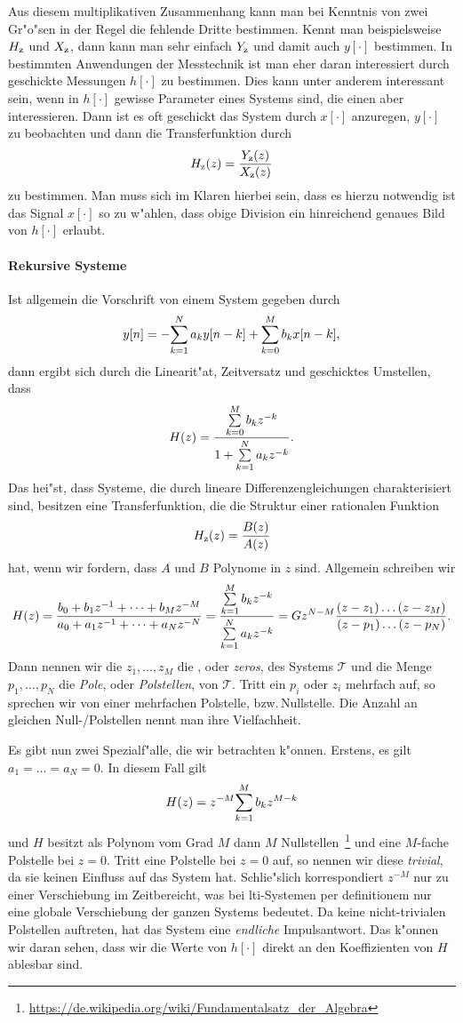 Aus diesem multiplikativen Zusammenhang kann man bei Kenntnis von zwei Gr"o"sen in der Regel die fehlende Dritte bestimmen.
Kennt man beispielsweise $H_{\rm z}$ und $X_{\rm z}$, dann kann man sehr einfach $Y_{\rm z}$ und damit auch $y[\cdot]$ bestimmen.
In bestimmten Anwendungen der Messtechnik ist man eher daran interessiert durch geschickte Messungen $h[\cdot]$ zu bestimmen.
Dies kann unter anderem interessant sein, wenn in $h[\cdot]$ gewisse Parameter eines Systems  sind, die einen aber interessieren.
Dann ist es oft geschickt das System durch $x[\cdot]$ anzuregen, $y[\cdot]$ zu beobachten und dann die Transferfunktion durch
\[
H_{\rm z}(z) = \frac{Y_{\rm z}(z)}{X_{\rm z}(z)}
\]
zu bestimmen.
Man muss sich im Klaren hierbei sein, dass es hierzu notwendig ist das Signal $x[\cdot]$ so zu w"ahlen, dass obige Division ein hinreichend genaues Bild von $h[\cdot]$ erlaubt.
%
%
\paragraph{Rekursive Systeme}
Ist allgemein die Vorschrift von einem System gegeben durch
\[
y[n] = -{\sum\limits_{k=1}^{N}{a_k y[n-k]}} + {\sum\limits_{k=0}^{M}{b_k x[n - k]}},
\]
dann ergibt sich durch die Linearit"at, Zeitversatz und geschicktes Umstellen, dass
\[
    H(z) = \frac{{\sum\limits_{k=0}^{M}{b_k z^{-k}}}}{1 + {\sum\limits_{k=1}^{N}{a_k z^{-k}}}}.
\]
Das hei"st, dass Systeme, die durch lineare Differenzengleichungen charakterisiert sind, besitzen eine Transferfunktion, die die Struktur einer rationalen Funktion
\[
H_{\rm z}(z) = \frac{B(z)}{A(z)}
\]
hat, wenn wir fordern, dass $A$ und $B$ Polynome in $z$ sind.
Allgemein schreiben wir
\[
H(z) = 
    \frac{
        b_0 + b_1 z^{-1} + \dots + b_M z^{-M}
    }{
        a_0 + a_1 z^{-1} + \dots + a_N z^{-N}
    }
    = \frac{
        {\sum\limits_{k = 1}^{M}{b_k z^{-k}}}
    }{
        {\sum\limits_{k = 1}^{N}{a_k z^{-k}}}
    }
    = G z^{N - M} \frac{
        (z - z_1) \dots (z - z_M)
    }{
        (z - p_1) \dots (z - p_N)
    }.
\]
Dann nennen wir die $z_1, \dots, z_M$ die , oder \emph{zeros}, des Systems $\mathcal{T}$ und die Menge $p_1 ,\dots, p_N$ die \emph{Pole}, oder \emph{Polstellen}, von $\mathcal{T}$.
Tritt ein $p_i$ oder $z_i$ mehrfach auf, so sprechen wir von einer mehrfachen Polstelle, bzw.\,Nullstelle.
Die Anzahl an gleichen Null-/Polstellen nennt man ihre Vielfachheit.

Es gibt nun zwei Spezialf"alle, die wir betrachten k"onnen. 
Erstens, es gilt $a_1 = \dots = a_N = 0$. 
In diesem Fall gilt 
\[
H(z) = z^{-M} {\sum\limits_{k = 1}^{M}{b_k z^{M-k}}}
\]
und $H$ besitzt als Polynom vom Grad $M$ dann $M$ Nullstellen~\footnote{\url{https://de.wikipedia.org/wiki/Fundamentalsatz_der_Algebra}} und eine $M$-fache Polstelle bei $z=0$.
Tritt eine Polstelle bei $z=0$ auf, so nennen wir diese \emph{trivial}, da sie keinen Einfluss auf das System hat.
Schlie"slich korrespondiert $z^{-M}$ nur zu einer Verschiebung im Zeitbereicht, was bei \gls{lti}-Systemen per definitionem nur eine globale Verschiebung der ganzen Systems bedeutet.
Da keine nicht-trivialen Polstellen auftreten, hat das System eine \emph{endliche} Impulsantwort.
Das k"onnen wir daran sehen, dass wir die Werte von $h[\cdot]$ direkt an den Koeffizienten von $H$ ablesbar sind.

